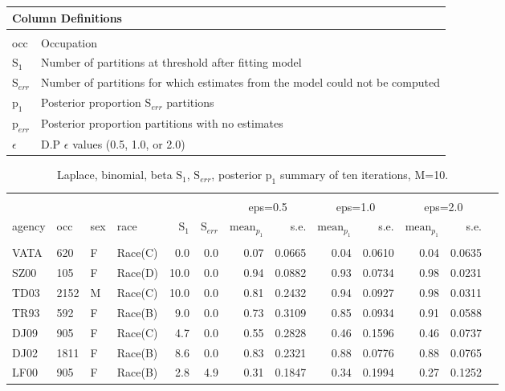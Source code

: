 \documentclass[10pt, letterpaper]{article}
\begin{document}
\begin{spacing}{1.0}
\clearpage

\begin{table}[ht]
    \begin{tabular}{p{1in}p{5in}}
        \multicolumn{2}{l}{Column Definitions} \\
        \hline
        & \\
        occ & Occupation\\
        $\text{S}_1$ & Number of partitions at threshold after fitting model \\
        $\text{S}_{err}$ & Number of partitions for which estimates from the model could not be computed \\
        $\text{p}_1$ & Posterior proportion $\text{S}_{err}$ partitions \\
        $\text{p}_{err}$ & Posterior proportion partitions with no estimates \\
        $\epsilon$ & D.P $\epsilon$ values (0.5, 1.0, or 2.0) \\
    \end{tabular}
\end{table}

\begin{table}[h!]
    \centering
    \caption{Laplace, binomial, beta $\text{S}_1$, $\text{S}_{err}$, posterior $\text{p}_1$ summary of ten iterations, M=10.}
    \label{table:lbb-M10}
    \begin{tabular}{llllrrrrrrrrr}
        \hline\\[-10pt]
        & & & & & & \multicolumn{2}{c}{eps=0.5} & \multicolumn{2}{c}{eps=1.0} & \multicolumn{2}{c}{eps=2.0} \\
        agency & occ & sex & race & $\text{S}_1$ & $\text{S}_{err}$ & $\text{mean}_{p_1}$ & s.e. & $\text{mean}_{p_1}$ & s.e. & $\text{mean}_{p_1}$ & s.e. \\ 
        \hline\\[-6pt]
        VATA & 620 & F & Race(C) & 0.0 & 0.0 & 0.07 & 0.0665 & 0.04 & 0.0610 & 0.04 & 0.0635 \\ 
        SZ00 & 105 & F & Race(D) & 10.0 & 0.0 & 0.94 & 0.0882 & 0.93 & 0.0734 & 0.98 & 0.0231 \\ 
        TD03 & 2152 & M & Race(C) & 10.0 & 0.0 & 0.81 & 0.2432 & 0.94 & 0.0927 & 0.98 & 0.0311 \\ 
        TR93 & 592 & F & Race(B) & 9.0 & 0.0 & 0.73 & 0.3109 & 0.85 & 0.0934 & 0.91 & 0.0588 \\ 
        DJ09 & 905 & F & Race(C) & 4.7 & 0.0 & 0.55 & 0.2828 & 0.46 & 0.1596 & 0.46 & 0.0737 \\ 
        DJ02 & 1811 & F & Race(B) & 8.6 & 0.0 & 0.83 & 0.2321 & 0.88 & 0.0776 & 0.88 & 0.0765 \\ 
        LF00 & 905 & F & Race(B) & 2.8 & 4.9 & 0.31 & 0.1847 & 0.34 & 0.1994 & 0.27 & 0.1252 \\ 
        \hline
    \end{tabular}
\end{table}


\end{spacing}
\end{document}
